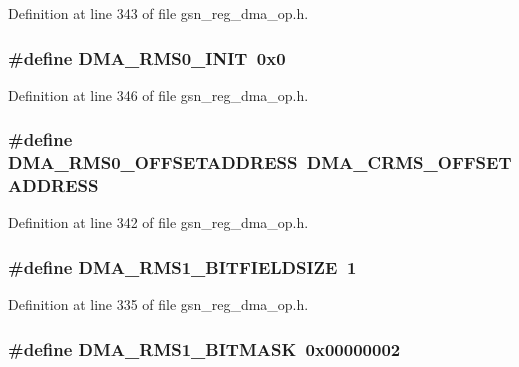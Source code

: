 Definition at line 343 of file gsn\_\-reg\_\-dma\_\-op.h.

\hypertarget{a00547_ac4aee16fc5d09a3013a79bfe80dd0679}{
\subsubsection[{DMA\_\-RMS0\_\-INIT}]{\setlength{\rightskip}{0pt plus 5cm}\#define DMA\_\-RMS0\_\-INIT~0x0}}
\label{a00547_ac4aee16fc5d09a3013a79bfe80dd0679}


Definition at line 346 of file gsn\_\-reg\_\-dma\_\-op.h.

\hypertarget{a00547_aedeb04809cfbf6d0c2dc3bd5d503d470}{
\subsubsection[{DMA\_\-RMS0\_\-OFFSETADDRESS}]{\setlength{\rightskip}{0pt plus 5cm}\#define DMA\_\-RMS0\_\-OFFSETADDRESS~DMA\_\-CRMS\_\-OFFSETADDRESS}}
\label{a00547_aedeb04809cfbf6d0c2dc3bd5d503d470}


Definition at line 342 of file gsn\_\-reg\_\-dma\_\-op.h.

\hypertarget{a00547_a2410508b4a08a0f86d6a0be09e3b57a5}{
\subsubsection[{DMA\_\-RMS1\_\-BITFIELDSIZE}]{\setlength{\rightskip}{0pt plus 5cm}\#define DMA\_\-RMS1\_\-BITFIELDSIZE~1}}
\label{a00547_a2410508b4a08a0f86d6a0be09e3b57a5}


Definition at line 335 of file gsn\_\-reg\_\-dma\_\-op.h.

\hypertarget{a00547_a7a3dc6c9367c782aef23aef7c763a806}{
\subsubsection[{DMA\_\-RMS1\_\-BITMASK}]{\setlength{\rightskip}{0pt plus 5cm}\#define DMA\_\-RMS1\_\-BITMASK~0x00000002}}
\label{a00547_a7a3dc6c9367c782aef23aef7c763a806}


